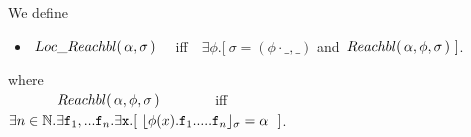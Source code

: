 {{\begin{definition} We define 
\begin{itemize}
\item
$ \,Loc\_Reachbl(\,\alpha,\sigma\,) $ \ \ iff\ \  
$\exists \phi.[\ \sigma=(\phi\cdot\_, \_)$ and $\Relevant \alpha \phi \sigma\ ]$. %
\end{itemize}
where\\
$\strut\ \ \ \  \ \ \ \ \ \ \,Reachbl(\,\alpha,\phi,\sigma\,) $  \ \ \ \ \ \ \ iff\ \  
$\exists n\in \mathbb{N}.\exists \prg{f}_1,... \prg{f}_n.\exists \prg{x}.[ \ \interpret{\sigma}{\phi(x).\prg{f}_1.....\prg{f}_n} = \alpha \ \ ]$.

\end{definition}

}}
